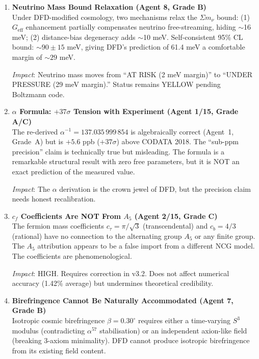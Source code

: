 \documentclass[11pt,a4paper]{article}
\begin{document}
\begin{enumerate}[label=\textbf{\arabic*.}, leftmargin=1.5cm]
\item \textbf{Neutrino Mass Bound Relaxation (Agent 8, Grade B)}\\
Under DFD-modified cosmology, two mechanisms relax the $\Sigma m_\nu$ bound: (1) $G_{\mathrm{eff}}$ enhancement partially compensates neutrino free-streaming, hiding $\sim$16 meV; (2) distance-bias degeneracy adds $\sim$10 meV. Self-consistent 95\% CL bound: $\sim 90 \pm 15$ meV, giving DFD's prediction of 61.4 meV a comfortable margin of $\sim 29$ meV.

\textit{Impact}: Neutrino mass moves from ``AT RISK (2 meV margin)'' to ``UNDER PRESSURE (29 meV margin).'' Status remains YELLOW pending Boltzmann code.

\item \textbf{$\alpha$ Formula: $+37\sigma$ Tension with Experiment (Agent 1/15, Grade A/C)}\\
The re-derived $\alpha^{-1} = 137.035\,999\,854$ is algebraically correct (Agent~1, Grade~A) but is $+5.6$ ppb ($+37\sigma$) above CODATA 2018. The ``sub-ppm precision'' claim is technically true but misleading. The formula is a remarkable structural result with zero free parameters, but it is NOT an exact prediction of the measured value.

\textit{Impact}: The $\alpha$ derivation is the crown jewel of DFD, but the precision claim needs honest recalibration.

\item \textbf{$c_f$ Coefficients Are NOT From $A_5$ (Agent 2/15, Grade C)}\\
The fermion mass coefficients $c_\tau = \pi/\sqrt{3}$ (transcendental) and $c_b = 4/3$ (rational) have no connection to the alternating group $A_5$ or any finite group. The $A_5$ attribution appears to be a false import from a different NCG model. The coefficients are phenomenological.

\textit{Impact}: HIGH. Requires correction in v3.2. Does not affect numerical accuracy (1.42\% average) but undermines theoretical credibility.

\item \textbf{Birefringence Cannot Be Naturally Accommodated (Agent 7, Grade B)}\\
Isotropic cosmic birefringence $\beta = 0.30^\circ$ requires either a time-varying $S^3$ modulus (contradicting $\alpha^{57}$ stabilisation) or an independent axion-like field (breaking 3-axiom minimality). DFD cannot produce isotropic birefringence from its existing field content.


\end{enumerate}
\end{document}

